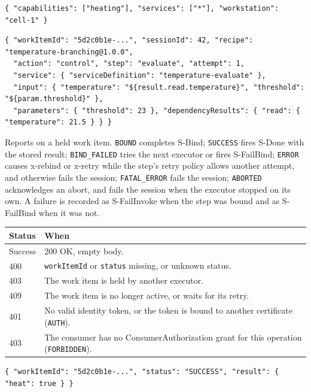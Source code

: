 \documentclass[a4paper]{arrowhead}
\begin{document}
\begin{lstlisting}[caption={Example request body}]
{ "capabilities": ["heating"], "services": ["*"], "workstation": "cell-1" }
\end{lstlisting}


\begin{lstlisting}[caption={Example response body}]
{ "workItemId": "5d2c0b1e-...", "sessionId": 42, "recipe": "temperature-branching@1.0.0",
  "action": "control", "step": "evaluate", "attempt": 1,
  "service": { "serviceDefinition": "temperature-evaluate" },
  "input": { "temperature": "${result.read.temperature}", "threshold": "${param.threshold}" },
  "parameters": { "threshold": 23 }, "dependencyResults": { "read": { "temperature": 21.5 } } }
\end{lstlisting}

Reports on a held work item. \texttt{BOUND} completes S-Bind; \texttt{SUCCESS} fires S-Done with the stored result; \texttt{BIND\_FAILED} tries the next executor or fires S-FailBind; \texttt{ERROR} causes x-rebind or x-retry while the step's retry policy allows another attempt, and otherwise fails the session; \texttt{FATAL\_ERROR} fails the session; \texttt{ABORTED} acknowledges an abort, and fails the session when the executor stopped on its own. A failure is recorded as S-FailInvoke when the step was bound and as S-FailBind when it was not.

{\small
\begin{longtable}{|p{2.0cm}|p{13.8cm}|}

\hline
\rowcolor{gray!33} Status & When \\ \hline
\endhead
Success & 200 OK, empty body. \\ \hline
400 & \texttt{workItemId} or \texttt{status} missing, or unknown status. \\ \hline
403 & The work item is held by another executor. \\ \hline
409 & The work item is no longer active, or waits for its retry. \\ \hline
401 & No valid identity token, or the token is bound to another certificate (\texttt{AUTH}). \\ \hline
403 & The consumer has no ConsumerAuthorization grant for this operation (\texttt{FORBIDDEN}). \\ \hline
\end{longtable}
}


\begin{lstlisting}[caption={Example request body}]
{ "workItemId": "5d2c0b1e-...", "status": "SUCCESS", "result": { "heat": true } }
\end{lstlisting}
\end{document}

